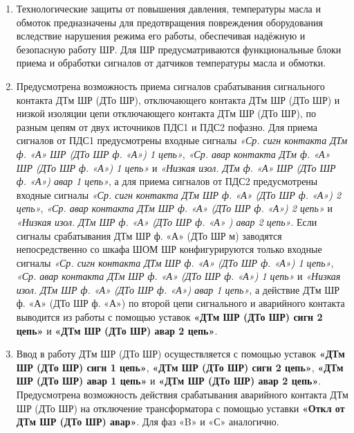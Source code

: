 \color{black}

\begin{enumerate}

\item
Технологические защиты от повышения давления, температуры масла и обмоток предназначены для предотвращения повреждения оборудования вследствие нарушения режима его работы, обеспечивая надёжную и безопасную работу ШР. Для ШР предусматриваются функциональные блоки приема и обработки сигналов от датчиков температуры масла и обмотки.

\item
Предусмотрена возможность приема сигналов срабатывания сигнального контакта ДТм ШР (ДТо ШР), отключающего контакта ДТм ШР  (ДТо ШР) и низкой изоляции цепи отключающего контакта ДТм ШР (ДТо ШР), по разным цепям от двух источников ПДС1 и ПДС2 пофазно. Для приема сигналов от ПДС1 предусмотрены входные сигналы \textit{«Ср. сигн контакта ДТм ф. «А» ШР (ДТо ШР ф. «А») 1 цепь»}, \textit{«Ср. авар контакта ДТм ф. «А» ШР (ДТо ШР ф. «А») 1 цепь»} и \textit{«Низкая изол. ДТм ф. «А» ШР  (ДТо ШР ф. «А») авар 1 цепь»}, а для приема сигналов от ПДС2 предусмотрены входные сигналы \textit{«Ср. сигн контакта ДТм ШР ф. «А» (ДТо ШР ф. «А») 2 цепь»}, \textit{«Ср. авар контакта ДТм ШР ф. «А» (ДТо ШР ф. «А») 2 цепь»} и \textit{«Низкая изол. ДТм ШР ф. «А» (ДТо ШР ф. «А» ) авар 2 цепь»}. Если сигналы срабатывания ДТм ШР ф. «А» (ДТо ШР м) заводятся непосредственно со шкафа ШОМ ШР конфигурируются только входные сигналы \textit{«Ср. сигн контакта ДТм ШР ф. «А» (ДТо ШР ф. «А») 1 цепь»}, \textit{«Ср. авар контакта ДТм ШР ф. «А» (ДТо ШР ф. «А») 1 цепь»} и \textit{«Низкая изол. ДТм ШР ф. «А» (ДТо ШР ф. «А») авар 1 цепь»}, а действие ДТм ШР ф. «А» (ДТо ШР ф. «А») по второй цепи сигнального и аварийного контакта выводится из работы с помощью уставок \textbf{«ДТм ШР (ДТо ШР) сигн 2 цепь»} и \textbf{«ДТм ШР (ДТо ШР) авар 2 цепь»}.

\item
Ввод в работу ДТм ШР (ДТо ШР) осуществляется с помощью уставок \textbf{«ДТм ШР (ДТо ШР) сигн 1 цепь»}, \textbf{«ДТм ШР (ДТо ШР) сигн 2 цепь»}, \textbf{«ДТм ШР (ДТо ШР) авар 1 цепь»} и \textbf{«ДТм ШР (ДТо ШР) авар 2 цепь»}. Предусмотрена возможность действия срабатывания аварийного контакта ДТм ШР (ДТо ШР) на отключение трансформатора с помощью уставки \textbf{«Откл от ДТм ШР (ДТо ШР) авар»}. Для фаз «B»
и «С» аналогично. 


\end{enumerate}
